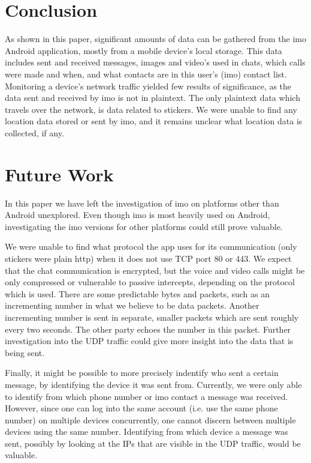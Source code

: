 \documentclass[conference]{IEEEtran}
\begin{document}
\section{Conclusion}\label{sec:conc}

As shown in this paper, significant amounts of data can be gathered from the
imo Android application, mostly from a mobile device's local storage. This data
includes sent and received messages, images and video's used in chats, which
calls were made and when, and what contacts are in this user's (imo) contact
list. Monitoring a device's network traffic yielded few results of
significance, as the data sent and received by imo is not in plaintext. The
only plaintext data which travels over the network, is data related to
stickers. We were unable to find any location data stored or sent by imo, and
it remains unclear what location data is collected, if any.


\section{Future Work}\label{sec:futwork}

In this paper we have left the investigation of imo on platforms other than
Android unexplored. Even though imo is most heavily used on Android,
investigating the imo versions for other platforms could still prove valuable.

We were unable to find what protocol the app uses for its communication (only
stickers were plain http) when it does not use TCP port 80 or 443. We expect
that the chat communication is encrypted, but the voice and video calls might
be only compressed or vulnerable to passive intercepts, depending on the
protocol which is used. There are some predictable bytes and packets, such as
an incrementing number in what we believe to be data packets. Another
incrementing number is sent in separate, smaller packets which are sent roughly
every two seconds. The other party echoes the number in this packet. Further
investigation into the UDP traffic could give more insight into the data that
is being sent.

Finally, it might be possible to more precisely indentify who sent a certain
message, by identifying the device it was sent from. Currently, we were only
able to identify from which phone number or imo contact a message was received.
However, since one can log into the same account (i.e. use the same phone
number) on multiple devices concurrently, one cannot discern between multiple
devices using the same number. Identifying from which device a message was
sent, possibly by looking at the IPs that are visible in the UDP traffic, would
be valuable.


\printbibliography
\end{document}

